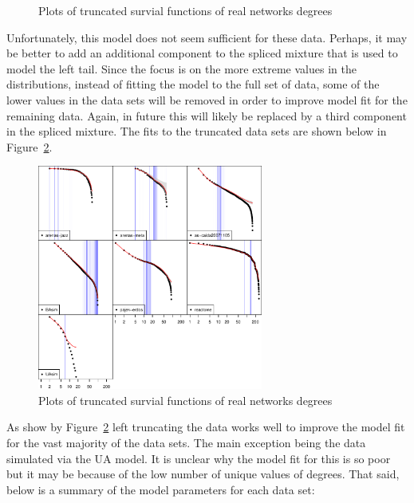 \documentclass[
  10pt,
  a4paper,
]{scrreprt}
\theoremstyle{plain}
\theoremstyle{plain}
\theoremstyle{plain}
\theoremstyle{definition}
\theoremstyle{remark}
\begin{document}
{\begin{figure}[H]
{}

\caption{\label{fig-fits1}Plots of truncated survial functions of real
networks degrees}

\end{figure}

Unfortunately, this model does not seem sufficient for these data.
Perhaps, it may be better to add an additional component to the spliced
mixture that is used to model the left tail. Since the focus is on the
more extreme values in the distributions, instead of fitting the model
to the full set of data, some of the lower values in the data sets will
be removed in order to improve model fit for the remaining data. Again,
in future this will likely be replaced by a third component in the
spliced mixture. The fits to the truncated data sets are shown below in
Figure~\ref{fig-fits2}.

\begin{figure}[H]

{\centering \includegraphics[width=0.66\textwidth,height=\textheight]{doc_files/figure-pdf/fig-fits2-1.pdf}

}

\caption{\label{fig-fits2}Plots of truncated survial functions of real
networks degrees}

\end{figure}

As show by Figure~\ref{fig-fits2} left truncating the data works well to
improve the model fit for the vast majority of the data sets. The main
exception being the data simulated via the UA model. It is unclear why
the model fit for this is so poor but it may be because of the low
number of unique values of degrees. That said, below is a summary of the
model parameters for each data set:

}
\end{document}

